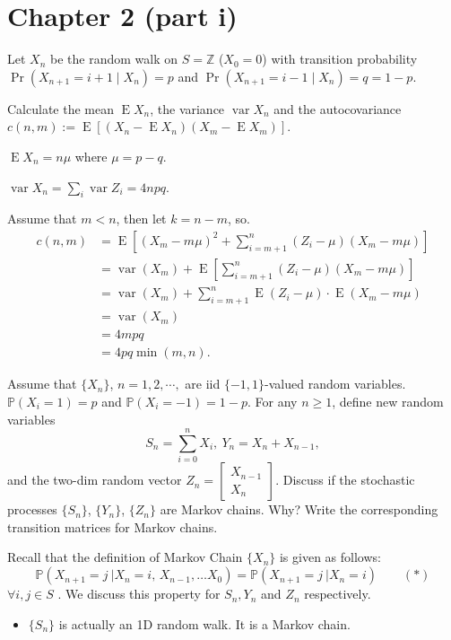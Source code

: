 \documentclass[  11pt]{article}
\newcommand{\p}{ {\Pr}}
\newcommand{\e}{ \operatorname{E}}
\newcommand{\Var}{\operatorname{var}}
\newcommand{\ZZ}{\mathbb{Z}}
\begin{document}
\section*{Chapter 2 (part i)}
\setcounter{Exercise}{0}
\begin{ExerciseList}


 \Exercise
 Let $X_n$  be the random walk on $S=\ZZ$
($X_0=0$) with transition probability
$\p(X_{n+1}=i+1\mid X_n) = p$
and $\p(X_{n+1}=i-1\mid X_n) = q=1-p$.

Calculate the mean $\e X_n$, the variance $\Var{X_n}$
and the autocovariance 
$c(n,m):=\e[(X_n - \e X_n)(X_m - \e X_m)]$.

\Answer
$\e X_n = n\mu$ where $\mu=p-q$.\par
$\Var X_n = \sum_i \Var Z_i = 4npq$. \par
Assume that $m<n$, then  let $k=n-m$,
so.
\[\begin{split}
c(n,m)&=
\e\left[(X_{m}  -m\mu)^2 + \sum_{i=m+1}^{n}( Z_i - \mu)(X_m - m\mu)\right] \\
&=\Var(X_m) + \e\left[ \sum_{i=m+1}^{n} (Z_i - \mu)(X_m - m\mu)\right] 
\\
&=
\Var(X_m) +\sum_{i=m+1}^{n}  \e ( Z_i - \mu) \cdot \e (X_m - m\mu) 
\\
&=\Var(X_m)\\
 &= 4mpq \\&= 4pq \min(m,n).
\end{split}
\]

\Exercise[difficulty=4]

 Assume that $\{X_n\}$, $n=1,2,\cdots,$ are iid  $\{-1,1\}$-valued random variables.
 $\mathbb{P}(X_i=1)=p$ and $\mathbb{P}(X_i=-1)=1-p$.   For any $n\geq 1$,  define new random variables 
 \[ 
 S_n = \sum_{i=0}^n X_i, \
   Y_n = X_{n}+X_{n-1}, 
 \]
and the two-dim random vector
   $
        Z_n = \begin{bmatrix} X_{n-1} \\ X_n\end{bmatrix}
   $.
Discuss if  the  stochastic processes $\{S_n\}$,  $\{Y_n\}$,  $\{Z_n\}$ are Markov chains. Why? Write the corresponding transition matrices for Markov chains. \\

\Answer

Recall that   the definition of Markov Chain $\{X_n\}$ is given as follows:
\[
\mathbb{P}(X_{n+1}=j\:\vert X_{n}=i,\, X_{n-1},\ldots X_{0})= \mathbb{P}(X_{n+1}=j\:\vert X_{n}=i)
\qquad (*)
\]
$\forall i, j \in S$ . We discuss this property for $S_n, Y_n$ and $Z_n$ respectively.
\begin{itemize}
\item  $\{S_n\}$ is actually an 1D random walk. It is a Markov chain.


\end{itemize}
\end{ExerciseList}
\end{document}
